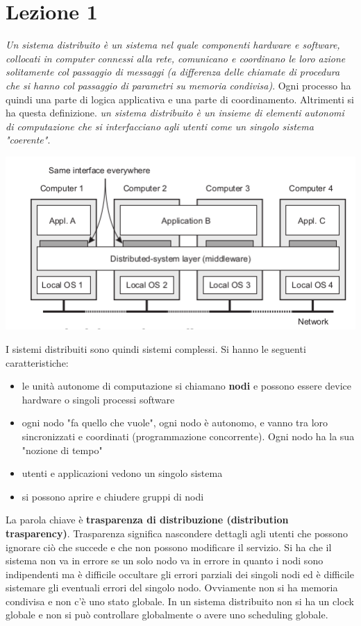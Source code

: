 \documentclass[a4paper,12pt, oneside]{book}
\begin{document}
\chapter{Lezione 1}
\textit{Un sistema distribuito è un sistema nel quale componenti hardware e software, collocati in computer connessi alla rete, comunicano e coordinano le loro azione solitamente col passaggio di messaggi (a differenza delle chiamate di procedura che si hanno col passaggio di parametri su memoria condivisa)}. Ogni processo ha quindi una parte di logica applicativa e una parte di coordinamento. Altrimenti si ha questa definizione. \textit{un sistema distribuito è un insieme di elementi autonomi di computazione che si interfacciano agli utenti come un singolo sistema "coerente"}.
\begin{center}
\includegraphics[scale=2.5]{img/cli.png}
\end{center}
I sistemi distribuiti sono quindi sistemi complessi. Si hanno le seguenti caratteristiche:
\begin{itemize}
\item le unità autonome di computazione si chiamano \textbf{nodi} e possono essere device hardware o singoli processi software
\item ogni nodo "fa quello che vuole", ogni nodo è autonomo, e vanno tra loro sincronizzati e coordinati (programmazione concorrente). Ogni nodo ha la sua "nozione di tempo"
\item utenti e applicazioni vedono un singolo sistema
\item si possono aprire e chiudere gruppi di nodi
\end{itemize}
La parola chiave è \textbf{trasparenza di distribuzione (distribution trasparency)}. Trasparenza significa nascondere dettagli agli utenti che possono ignorare ciò che succede e che non possono modificare il servizio. Si ha che il sistema non va in errore se un solo nodo va in errore in quanto i nodi sono indipendenti ma è difficile occultare gli errori parziali dei singoli nodi ed è difficile sistemare gli eventuali errori del singolo nodo. Ovviamente non si ha memoria condivisa e non c'è uno stato globale. In un sistema distribuito non si ha un clock globale e non si può controllare globalmente o avere uno scheduling globale.
\end{document}
